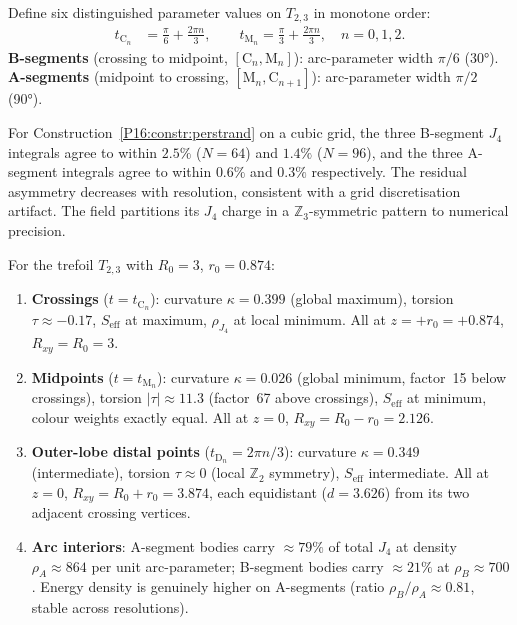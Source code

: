 \begin{definition}
\label{P16:def:arc_boundaries}
Define six distinguished parameter values on $T_{2,3}$ in monotone order:
\begin{align}
  t_{\mathrm{C}_n} &= \tfrac{\pi}{6}+\tfrac{2\pi n}{3}, \qquad
  t_{\mathrm{M}_n} = \tfrac{\pi}{3}+\tfrac{2\pi n}{3}, \quad n=0,1,2.
\end{align}
\textbf{B-segments} (crossing to midpoint, $[\mathrm{C}_n,\mathrm{M}_n]$):
arc-parameter width $\pi/6$ (30°).
\textbf{A-segments} (midpoint to crossing, $[\mathrm{M}_n,\mathrm{C}_{n+1}]$):
arc-parameter width $\pi/2$ (90°).
\end{definition}

\begin{proposition}
\label{P16:prop:z3_symmetry}
For Construction~\ref{P16:constr:perstrand} on a cubic grid, the three
B-segment $J_4$ integrals agree to within $2.5\%$ ($N=64$) and $1.4\%$
($N=96$), and the three A-segment integrals agree to within $0.6\%$ and
$0.3\%$ respectively. The residual asymmetry decreases with resolution,
consistent with a grid discretisation artifact. The field partitions its
$J_4$ charge in a $\mathbb{Z}_3$-symmetric pattern to numerical precision.
\end{proposition}

\begin{proposition}
\label{P16:prop:geom_data}
For the trefoil $T_{2,3}$ with $R_0=3$, $r_0=0.874$:
\begin{enumerate}
\item \textbf{Crossings} ($t=t_{\mathrm{C}_n}$): curvature $\kappa=0.399$
  (global maximum), torsion $\tau\approx-0.17$, $S_{\mathrm{eff}}$ at
  maximum, $\rho_{J_4}$ at local minimum. All at $z=+r_0=+0.874$, $R_{xy}=R_0=3$.
\item \textbf{Midpoints} ($t=t_{\mathrm{M}_n}$): curvature $\kappa=0.026$
  (global minimum, factor~15 below crossings), torsion $|\tau|\approx11.3$
  (factor~67 above crossings), $S_{\mathrm{eff}}$ at minimum, colour
  weights exactly equal. All at $z=0$, $R_{xy}=R_0-r_0=2.126$.
\item \textbf{Outer-lobe distal points} ($t_{\mathrm{D}_n}=2\pi n/3$):
  curvature $\kappa=0.349$ (intermediate), torsion $\tau\approx0$ (local
  $\mathbb{Z}_2$ symmetry), $S_{\mathrm{eff}}$ intermediate. All at $z=0$,
  $R_{xy}=R_0+r_0=3.874$, each equidistant ($d=3.626$) from its two
  adjacent crossing vertices.
\item \textbf{Arc interiors}: A-segment bodies carry $\approx79\%$ of total
  $J_4$ at density $\rho_A\approx864$ per unit arc-parameter; B-segment
  bodies carry $\approx21\%$ at $\rho_B\approx700$. Energy density is
  genuinely higher on A-segments (ratio $\rho_B/\rho_A\approx0.81$, stable
  across resolutions).
\end{enumerate}
\end{proposition}

